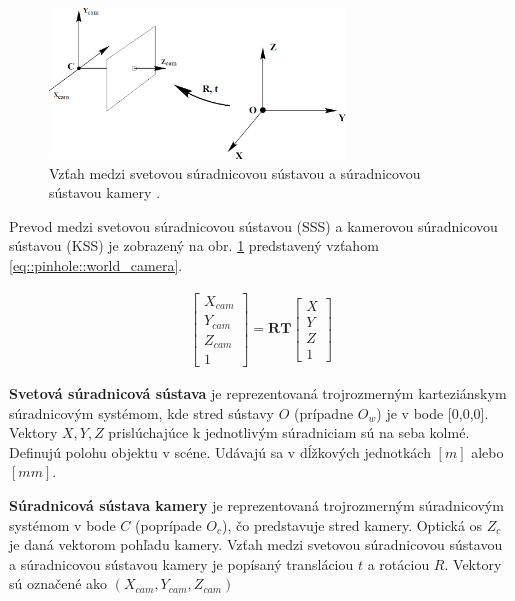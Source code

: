 \begin{figure}[h]
	\centering
	\includegraphics[width=0.7\textwidth]{figures/rotat_translat.jpg} 
	\caption{Vzťah medzi svetovou súradnicovou sústavou a súradnicovou sústavou kamery \cite{zisserman2004multiple}.}
	\label{fig:rotat_translat}
\end{figure}

Prevod medzi svetovou súradnicovou sústavou (SSS) a kamerovou súradnicovou sústavou (KSS) je zobrazený na obr. \ref{fig:rotat_translat} predstavený vzťahom \ref{eq::pinhole::world_camera}.\newline 

\begin{equation}
\label{eq::pinhole::world_camera}
\begin{aligned}
\begin{bmatrix}
X_{cam} \\ Y_{cam} \\ Z_{cam} \\ 1
\end{bmatrix}=
\boldsymbol{RT}
\begin{bmatrix}
X \\ Y \\ Z \\ 1
\end{bmatrix}
\end{aligned}
\end{equation}

\newpage
\textbf{Svetová súradnicová sústava} je reprezentovaná trojrozmerným karteziánskym súradnicovým systémom, kde stred sústavy $O$ (prípadne $O_w$) je v bode [0,0,0]. Vektory $X,Y,Z$ prislúchajúce k jednotlivým súradniciam sú na seba kolmé. Definujú polohu objektu v scéne. Udávajú sa v dĺžkových jednotkách $[m]$ alebo $[mm]$.\newline 

\textbf{Súradnicová sústava kamery} je reprezentovaná trojrozmerným súradnicovým systémom v bode $C$ (poprípade $O_c$), čo predstavuje stred kamery. Optická os $Z_c$ je daná vektorom pohľadu kamery. Vzťah medzi svetovou súradnicovou sústavou a súradnicovou sústavou kamery je popísaný transláciou $t$ a rotáciou $R$. Vektory sú označené ako $(X_{cam},Y_{cam},Z_{cam})$ \newline 

